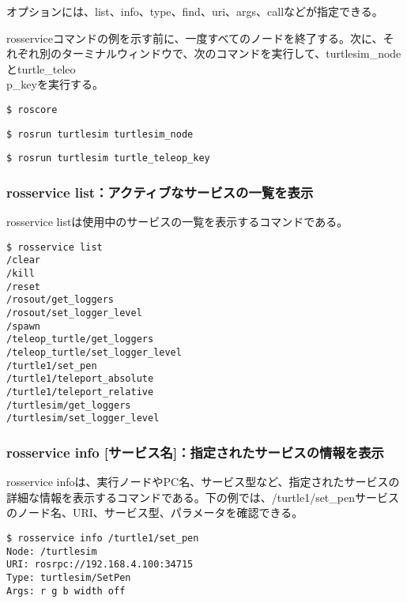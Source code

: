 オプションには、list、info、type、find、uri、args、callなどが指定できる。

rosserviceコマンドの例を示す前に、一度すべてのノードを終了する。次に、それぞれ別のターミナルウィンドウで、次のコマンドを実行して、turtlesim\_nodeとturtle\_teleo\\p\_keyを実行する。

\begin{lstlisting}[language=ROS]
$ roscore
\end{lstlisting}

\begin{lstlisting}[language=ROS]
$ rosrun turtlesim turtlesim_node
\end{lstlisting}

\begin{lstlisting}[language=ROS]
$ rosrun turtlesim turtle_teleop_key
\end{lstlisting}

\subsubsection{rosservice list：アクティブなサービスの一覧を表示}

rosservice listは使用中のサービスの一覧を表示するコマンドである。

\begin{lstlisting}[language=ROS]
$ rosservice list
/clear
/kill
/reset
/rosout/get_loggers
/rosout/set_logger_level
/spawn
/teleop_turtle/get_loggers
/teleop_turtle/set_logger_level
/turtle1/set_pen
/turtle1/teleport_absolute
/turtle1/teleport_relative
/turtlesim/get_loggers
/turtlesim/set_logger_level
\end{lstlisting}

\subsubsection{rosservice info [サービス名]：指定されたサービスの情報を表示}

rosservice infoは、実行ノードやPC名、サービス型など、指定されたサービスの詳細な情報を表示するコマンドである。下の例では、/turtle1/set\_penサービスのノード名、URI、サービス型、パラメータを確認できる。

\begin{lstlisting}[language=ROS]
$ rosservice info /turtle1/set_pen
Node: /turtlesim
URI: rosrpc://192.168.4.100:34715
Type: turtlesim/SetPen
Args: r g b width off
\end{lstlisting}

